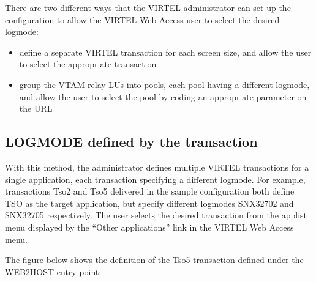 \documentclass[letterpaper,10pt,english]{sphinxmanual}
\begin{document}
There are two different ways that the VIRTEL administrator can set up the configuration to allow the VIRTEL Web
Access user to select the desired logmode:
\begin{itemize}
\item {} 
define a separate VIRTEL transaction for each screen size, and allow the user to select the appropriate transaction

\item {} 
group the VTAM relay LUs into pools, each pool having a different logmode, and allow the user to select the pool by coding an appropriate parameter on the URL

\end{itemize}


\subsection{LOGMODE defined by the transaction}
\label{\detokenize{User_Guide:logmode-defined-by-the-transaction}}
With this method, the administrator defines multiple VIRTEL transactions for a single application, each transaction
specifying a different logmode. For example, transactions Tso2 and Tso5 delivered in the sample configuration both
define TSO as the target application, but specify different logmodes SNX32702 and SNX32705 respectively. The user
selects the desired transaction from the applist menu displayed by the “Other applications” link in the VIRTEL Web
Access menu.

The figure below shows the definition of the Tso5 transaction defined under the WEB2HOST entry point:
\end{document}
